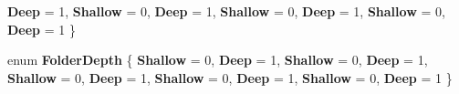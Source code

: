 \begin{DoxyCompactItemize}
{\bfseries Deep} = 1, 
\newline
{\bfseries Shallow} = 0, 
{\bfseries Deep} = 1, 
{\bfseries Shallow} = 0, 
{\bfseries Deep} = 1, 
\newline
{\bfseries Shallow} = 0, 
{\bfseries Deep} = 1
 \}
\item 
\mbox{\label{namespace_windows_1_1_storage_1_1_search_ab15c89d1838f508affd2b26fb037d399}} 
enum {\bfseries Folder\+Depth} \{ \newline
{\bfseries Shallow} = 0, 
{\bfseries Deep} = 1, 
{\bfseries Shallow} = 0, 
{\bfseries Deep} = 1, 
\newline
{\bfseries Shallow} = 0, 
{\bfseries Deep} = 1, 
{\bfseries Shallow} = 0, 
{\bfseries Deep} = 1, 
\newline
{\bfseries Shallow} = 0, 
{\bfseries Deep} = 1
 \}
\end{DoxyCompactItemize}
